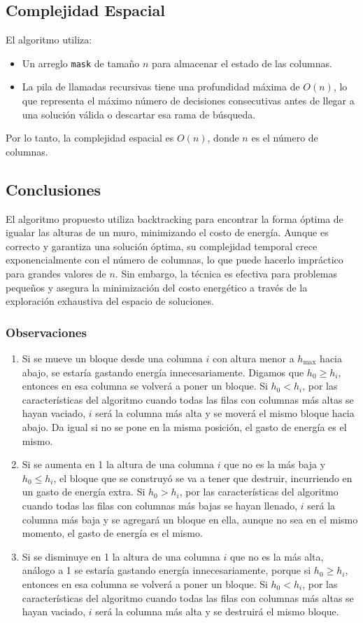 \documentclass[a4paper,12pt]{article}
\begin{document}
\subsection{Complejidad Espacial}
El algoritmo utiliza:
\begin{itemize}
	\item Un arreglo \texttt{mask} de tamaño \( n \) para almacenar el estado de las columnas.
	\item La pila de llamadas recursivas tiene una profundidad máxima de \( O(n) \), lo que representa el máximo número de decisiones consecutivas antes de llegar a una solución válida o descartar esa rama de búsqueda.
\end{itemize}
Por lo tanto, la complejidad espacial es \( O(n) \), donde \( n \) es el número de columnas.

\subsection{Conclusiones}
El algoritmo propuesto utiliza backtracking para encontrar la forma óptima de igualar las alturas de un muro, minimizando el costo de energía. Aunque es correcto y garantiza una solución óptima, su complejidad temporal crece exponencialmente con el número de columnas, lo que puede hacerlo impráctico para grandes valores de \( n \). Sin embargo, la técnica es efectiva para problemas pequeños y asegura la minimización del costo energético a través de la exploración exhaustiva del espacio de soluciones.

\subsubsection{Observaciones}
\begin{enumerate}
	\item Si se mueve un bloque desde una columna \( i \) con altura menor a \( h_{\text{max}} \) hacia abajo, se estaría gastando energía innecesariamente. Digamos que \( h_0 \geq h_i \), entonces en esa columna se volverá a poner un bloque. Si \( h_0 < h_i \), por las características del algoritmo cuando todas las filas con columnas más altas se hayan vaciado, \( i \) será la columna más alta y se moverá el mismo bloque hacia abajo. Da igual si no se pone en la misma posición, el gasto de energía es el mismo.
	\item Si se aumenta en 1 la altura de una columna \( i \) que no es la más baja y \( h_0 \leq h_i \), el bloque que se construyó se va a tener que destruir, incurriendo en un gasto de energía extra. Si \( h_0 > h_i \), por las características del algoritmo cuando todas las filas con columnas más bajas se hayan llenado, \( i \) será la columna más baja y se agregará un bloque en ella, aunque no sea en el mismo momento, el gasto de energía es el mismo.
	\item Si se disminuye en 1 la altura de una columna \( i \) que no es la más alta, análogo a 1 se estaría gastando energía innecesariamente, porque si \( h_0 \geq h_i \), entonces en esa columna se volverá a poner un bloque. Si \( h_0 < h_i \), por las características del algoritmo cuando todas las filas con columnas más altas se hayan vaciado, \( i \) será la columna más alta y se destruirá el mismo bloque.
\end{enumerate}
\end{document}

